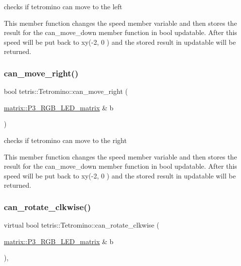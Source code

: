 checks if tetromino can move to the left 

This member function changes the speed member variable and then stores the result for the can\+\_\+move\+\_\+down member function in bool updatable. After this speed will be put back to xy(-\/2, 0 ) and the stored result in updatable will be returned. \mbox{\label{classtetris_1_1Tetromino_a55f3f84840d8c5d5e37765a64d59d8d9}} 
\subsubsection{\texorpdfstring{can\+\_\+move\+\_\+right()}{can\_move\_right()}}
{\footnotesize\ttfamily bool tetris\+::\+Tetromino\+::can\+\_\+move\+\_\+right (\begin{DoxyParamCaption}\item[{\hyperlink{classmatrix_1_1P3__RGB__LED__matrix}{matrix\+::\+P3\+\_\+\+R\+G\+B\+\_\+\+L\+E\+D\+\_\+matrix} \&}]{b }\end{DoxyParamCaption})\hspace{0.3cm}{\ttfamily [inline]}}



checks if tetromino can move to the right 

This member function changes the speed member variable and then stores the result for the can\+\_\+move\+\_\+down member function in bool updatable. After this speed will be put back to xy(-\/2, 0 ) and the stored result in updatable will be returned. \mbox{\label{classtetris_1_1Tetromino_a7572a9fba3397bf92dba30f79bec908b}} 
\subsubsection{\texorpdfstring{can\+\_\+rotate\+\_\+clkwise()}{can\_rotate\_clkwise()}}
{\footnotesize\ttfamily virtual bool tetris\+::\+Tetromino\+::can\+\_\+rotate\+\_\+clkwise (\begin{DoxyParamCaption}\item[{\hyperlink{classmatrix_1_1P3__RGB__LED__matrix}{matrix\+::\+P3\+\_\+\+R\+G\+B\+\_\+\+L\+E\+D\+\_\+matrix} \&}]{b }\end{DoxyParamCaption})\hspace{0.3cm}{\ttfamily [inline]}, {\ttfamily [virtual]}}




